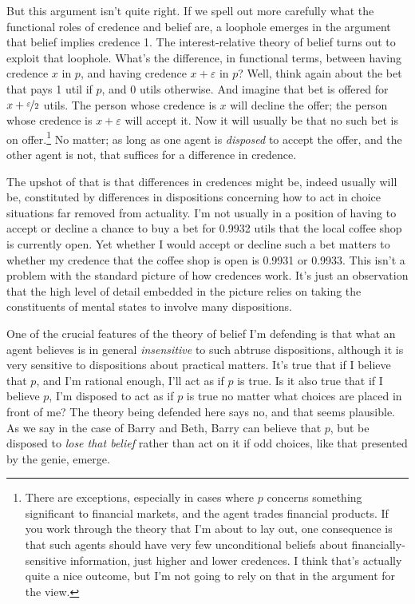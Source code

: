 But this argument isn't quite right. If we spell out more carefully what the functional roles of credence and belief are, a loophole emerges in the argument that belief implies credence 1. The interest-relative theory of belief turns out to exploit that loophole. What's the difference, in functional terms, between having credence $x$ in $p$, and having credence $x + \varepsilon$ in $p$? Well, think again about the bet that pays 1 util if $p$, and 0 utils otherwise. And imagine that bet is offered for $x + \nicefrac{\varepsilon}{2}$ utils. The person whose credence is $x$ will decline the offer; the person whose credence is $x + \varepsilon$ will accept it. Now it will usually be that no such bet is on offer.\footnote{There are exceptions, especially in cases where $p$ concerns something significant to financial markets, and the agent trades financial products. If you work through the theory that I'm about to lay out, one consequence is that such agents should have very few unconditional beliefs about financially-sensitive information, just higher and lower credences. I think that's actually quite a nice outcome, but I'm not going to rely on that in the argument for the view.} No matter; as long as one agent is \textit{disposed} to accept the offer, and the other agent is not, that suffices for a difference in credence.

The upshot of that is that differences in credences might be, indeed usually will be, constituted by differences in dispositions concerning how to act in choice situations far removed from actuality. I'm not usually in a position of having to accept or decline a chance to buy a bet for 0.9932 utils that the local coffee shop is currently open. Yet whether I would accept or decline such a bet matters to whether my credence that the coffee shop is open is 0.9931 or 0.9933. This isn't a problem with the standard picture of how credences work. It's just an observation that the high level of detail embedded in the picture relies on taking the constituents of mental states to involve many dispositions.

One of the crucial features of the theory of belief I'm defending is that what an agent believes is in general \textit{insensitive} to such abtruse dispositions, although it is very sensitive to dispositions about practical matters. It's true that if I believe that $p$, and I'm rational enough, I'll act as if $p$ is true. Is it also true that if I believe $p$, I'm disposed to act as if $p$ is true no matter what choices are placed in front of me? The theory being defended here says no, and that seems plausible. As we say in the case of Barry and Beth, Barry can believe that $p$, but be disposed to \textit{lose that belief} rather than act on it if odd choices, like that presented by the genie, emerge.

